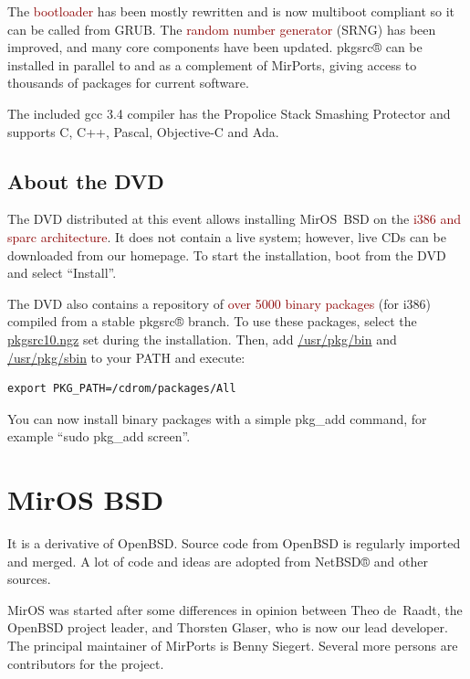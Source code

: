 \documentclass[a4paper,landscape,11pt,notumble]{leaflet}
\begin{document}
The \textcolor{darkred}{bootloader} has been mostly rewritten and is now multiboot compliant so it can be called from GRUB.
The \textcolor{darkred}{random number generator} (SRNG) has been improved, and many core components have been updated.
pkgsrc® can be installed in parallel to and as a complement of MirPorts, giving access to thousands of packages for current software. 

The included gcc 3.4 compiler has the Propolice Stack Smashing Protector and supports C, C++, Pascal,  Objective-C and Ada.


\subsection{About the DVD}

The DVD distributed at this event allows installing MirOS~BSD on the \textcolor{darkred}{i386 and sparc architecture}.
It does not contain a live system; however, live CDs can be downloaded from our homepage.
To start the installation, boot from the DVD and select ``Install''.

The DVD also contains a repository of \textcolor{darkred}{over 5000 binary packages} (for i386) compiled from a stable pkgsrc® branch.
To use these packages, select the \url{pkgsrc10.ngz} set during the installation.
Then, add \url{/usr/pkg/bin} and \url{/usr/pkg/sbin} to your PATH and execute:
%
\begin{verbatim}
export PKG_PATH=/cdrom/packages/All
\end{verbatim}
%
You can now install binary packages with a simple pkg\_add command, for example ``sudo pkg\_add screen''.

\newpage

\section{MirOS BSD}


It is a derivative of OpenBSD. Source code from OpenBSD is regularly imported and merged. A lot of code and ideas are adopted from NetBSD® and other sources.

MirOS was started after some differences in opinion between Theo de~Raadt, the OpenBSD project leader, and Thorsten Glaser, who is now our lead developer. The principal maintainer of MirPorts is Benny Siegert. Several more persons are contributors for the project.
\end{document}
